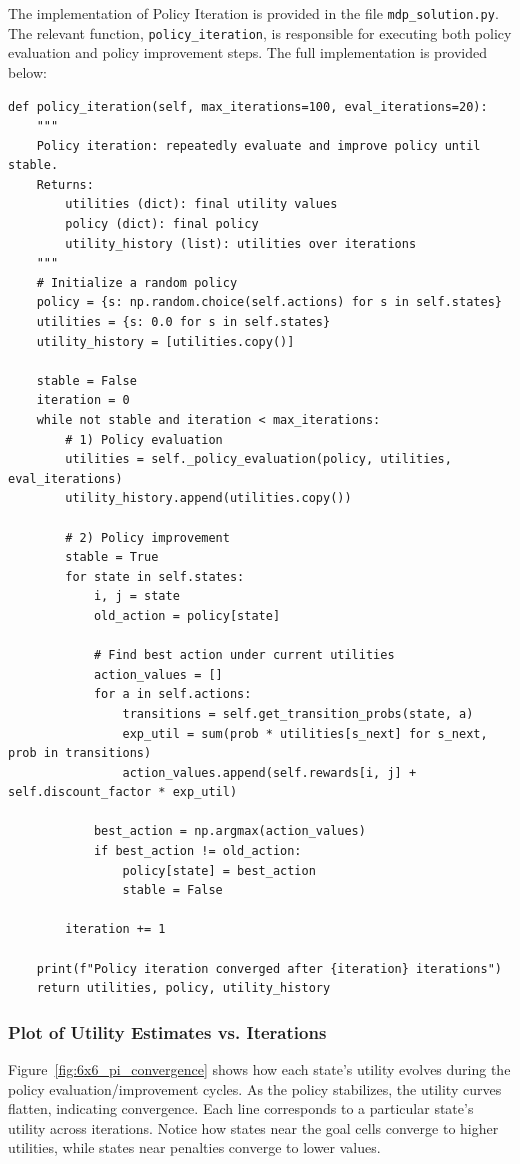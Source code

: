 \documentclass[11pt]{article}
\begin{document}
\newpage
\noindent The implementation of Policy Iteration is provided in the file \texttt{mdp\_solution.py}. The relevant function, \texttt{policy\_iteration}, is responsible for executing both policy evaluation and policy improvement steps. The full implementation is provided below:

\begin{verbatim}
def policy_iteration(self, max_iterations=100, eval_iterations=20):
    """
    Policy iteration: repeatedly evaluate and improve policy until stable.
    Returns:
        utilities (dict): final utility values
        policy (dict): final policy
        utility_history (list): utilities over iterations
    """
    # Initialize a random policy
    policy = {s: np.random.choice(self.actions) for s in self.states}
    utilities = {s: 0.0 for s in self.states}
    utility_history = [utilities.copy()]

    stable = False
    iteration = 0
    while not stable and iteration < max_iterations:
        # 1) Policy evaluation
        utilities = self._policy_evaluation(policy, utilities, eval_iterations)
        utility_history.append(utilities.copy())

        # 2) Policy improvement
        stable = True
        for state in self.states:
            i, j = state
            old_action = policy[state]

            # Find best action under current utilities
            action_values = []
            for a in self.actions:
                transitions = self.get_transition_probs(state, a)
                exp_util = sum(prob * utilities[s_next] for s_next, prob in transitions)
                action_values.append(self.rewards[i, j] + self.discount_factor * exp_util)

            best_action = np.argmax(action_values)
            if best_action != old_action:
                policy[state] = best_action
                stable = False

        iteration += 1

    print(f"Policy iteration converged after {iteration} iterations")
    return utilities, policy, utility_history
\end{verbatim}

\newpage
\subsubsection{Plot of Utility Estimates vs. Iterations}
Figure~\ref{fig:6x6_pi_convergence} shows how each state's utility evolves during the policy evaluation/improvement cycles. As the policy stabilizes, the utility curves flatten, indicating convergence. Each line corresponds to a particular state's utility across iterations. Notice how states near the goal cells converge to higher utilities, while states near penalties converge to lower values.
\end{document}
